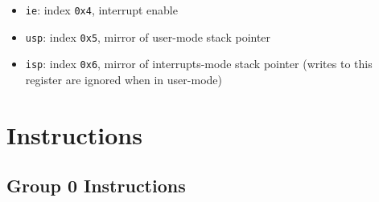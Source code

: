 \documentclass{article}
\begin{document}
\begin{itemize}
\begin{itemize}
		\item \texttt{ie}: index \texttt{0x4}, interrupt enable
		\item \texttt{usp}: index \texttt{0x5}, mirror of user-mode stack
			pointer
		\item \texttt{isp}: index \texttt{0x6}, mirror of interrupts-mode
			stack pointer (writes to this register are ignored when in
			user-mode)
		\end{itemize}
	\end{itemize}

\section{Instructions}
	\subsection{Group 0 Instructions}
\end{document}
